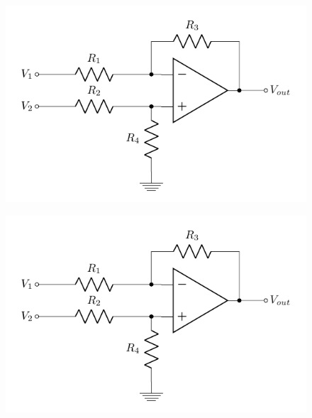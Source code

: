 \documentclass[12pt]{article}
\begin{document}
	\begin{figure}[H] %
		\centering
		\includegraphics{diffamp}
		\caption{\rajah}
		\label{fig:diffamp2}
	\end{figure}

	\begin{figure}[H] %
		\centering
		\includegraphics{diffamp}
		\caption{\rajah}
		\label{fig:diffamp3}
	\end{figure}
	
\end{document}
